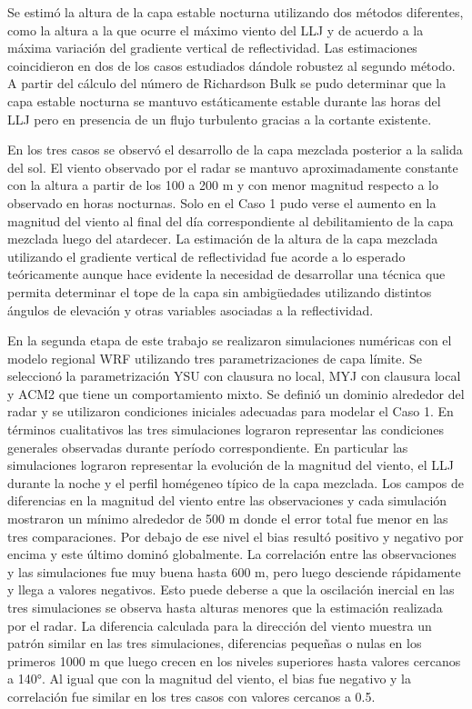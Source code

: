 \documentclass[12pt,spanish,oneside, a4paper]{book}
\begin{document}
Se estimó la altura de la capa estable nocturna utilizando dos métodos
diferentes, como la altura a la que ocurre el máximo viento del LLJ y de
acuerdo a la máxima variación del gradiente vertical de reflectividad.
Las estimaciones coincidieron en dos de los casos estudiados dándole
robustez al segundo método. A partir del cálculo del número de
Richardson Bulk se pudo determinar que la capa estable nocturna se
mantuvo estáticamente estable durante las horas del LLJ pero en
presencia de un flujo turbulento gracias a la cortante existente.

En los tres casos se observó el desarrollo de la capa mezclada posterior
a la salida del sol. El viento observado por el radar se mantuvo
aproximadamente constante con la altura a partir de los 100 a 200 m y
con menor magnitud respecto a lo observado en horas nocturnas. Solo en
el Caso 1 pudo verse el aumento en la magnitud del viento al final del
día correspondiente al debilitamiento de la capa mezclada luego del
atardecer. La estimación de la altura de la capa mezclada utilizando el
gradiente vertical de reflectividad fue acorde a lo esperado
teóricamente aunque hace evidente la necesidad de desarrollar una
técnica que permita determinar el tope de la capa sin ambigüedades
utilizando distintos ángulos de elevación y otras variables asociadas a
la reflectividad.

En la segunda etapa de este trabajo se realizaron simulaciones numéricas
con el modelo regional WRF utilizando tres parametrizaciones de capa
límite. Se seleccionó la parametrización YSU con clausura no local, MYJ
con clausura local y ACM2 que tiene un comportamiento mixto. Se definió
un dominio alrededor del radar y se utilizaron condiciones iniciales
adecuadas para modelar el Caso 1. En términos cualitativos las tres
simulaciones lograron representar las condiciones generales observadas
durante período correspondiente. En particular las simulaciones lograron
representar la evolución de la magnitud del viento, el LLJ durante la
noche y el perfil homégeneo típico de la capa mezclada. Los campos de
diferencias en la magnitud del viento entre las observaciones y cada
simulación mostraron un mínimo alrededor de 500 m donde el error total
fue menor en las tres comparaciones. Por debajo de ese nivel el bias
resultó positivo y negativo por encima y este último dominó globalmente.
La correlación entre las observaciones y las simulaciones fue muy buena
hasta 600 m, pero luego desciende rápidamente y llega a valores
negativos. Esto puede deberse a que la oscilación inercial en las tres
simulaciones se observa hasta alturas menores que la estimación
realizada por el radar. La diferencia calculada para la dirección del
viento muestra un patrón similar en las tres simulaciones, diferencias
pequeñas o nulas en los primeros 1000 m que luego crecen en los niveles
superiores hasta valores cercanos a 140°. Al igual que con la magnitud
del viento, el bias fue negativo y la correlación fue similar en los
tres casos con valores cercanos a 0.5.
\end{document}
